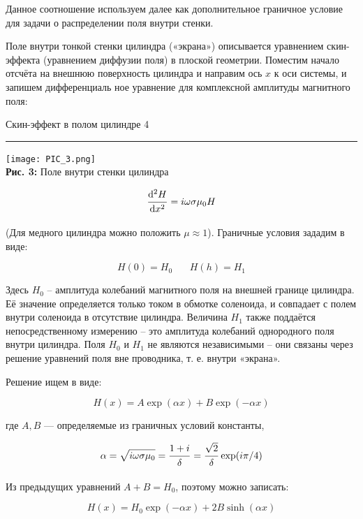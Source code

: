 \documentclass[12pt,a4paper]{scrartcl}
\begin{document}
	Данное соотношение используем далее как дополнительное граничное условие для задачи о распределении поля внутри стенки.
	
	Поле внутри тонкой стенки цилиндра («экрана») описывается уравнением скин-эффекта (уравнением диффузии поля) в плоской геометрии. Поместим начало отсчёта на внешнюю поверхность цилиндра и направим ось $x$ к оси системы, и запишем дифференциаль ное уравнение для комплексной амплитуды магнитного поля:
	\newpage
	
	
	\begin{flushleft}
	\footnotesize{Скин-эффект в полом цилиндре} \hspace{\fill} \footnotesize{4}
	\\[-0.3cm]\noindent\rule{\textwidth}{0.3pt}
\end{flushleft}
	
	\begin{center}
		\texttt{[image: PIC\_3.png]}
		\\\textbf{Рис. 3:} Поле внутри стенки цилиндра
	\end{center}
	
	$$\dfrac{\strut \mathrm{d}^2 H}{\strut \mathrm{d} x^2} = i \omega \sigma \mu_0 H$$
	
	(Для медного цилиндра можно положить $\mu \approx 1$). Граничные условия зададим в виде:
	
	$$H(0) = H_0 \ \ \ \ \ \ \ \ H(h) = H_1$$
	
	
	Здесь $H_0$ -- амплитуда колебаний магнитного поля на внешней границе цилиндра. Её значение определяется только током в обмотке соленоида, и совпадает с полем внутри соленоида в отсутствие цилиндра. Величина $H_1$ также поддаётся непосредственному измерению -- это амплитуда колебаний однородного поля внутри цилиндра. Поля $H_0$ и $H_1$ не являются независимыми -- они связаны через решение уравнений поля вне проводника, т. е. внутри «экрана».
	
	Решение ищем в виде:
	
	$$H(x) = A\exp(\alpha x) + B\exp(-\alpha x)$$
	
	где $A, B$ — определяемые из граничных условий константы,
	
	$$\alpha = \sqrt{i \omega \sigma \mu_0} = \dfrac{\strut 1 + i}{\strut \delta} = \dfrac{\strut \sqrt{2}}{\strut \delta}\exp(i\pi / 4)$$
	
	Из предыдущих уравнений $A + B = H_0$, поэтому можно записать:
	
	$$H(x) = H_0\exp(-\alpha x) + 2B\sinh (\alpha x)$$
	
\end{document}
